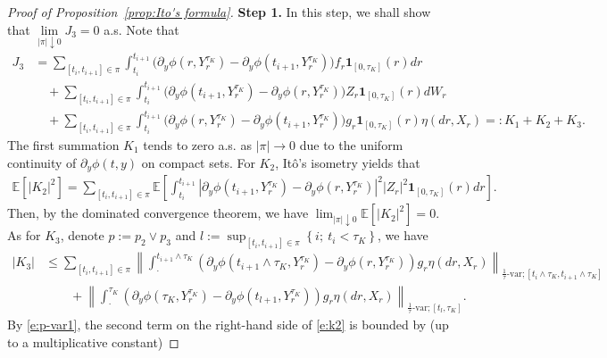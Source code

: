 \documentclass[11pt,reqno]{amsart}
\def\E{\mathbb E}
\numberwithin{equation}{section}
\begin{document}
\begin{proof}[Proof of Proposition~\ref{prop:Ito's formula}]
\textbf{Step 1.}
In this step, we shall show that $\lim\limits_{|\pi|\downarrow 0}J_{3} = 0$ a.s.  Note that
\begin{equation*}	\begin{aligned}
J_{3} &= \sum_{[t_{i},t_{i+1}]\in \pi} \int_{t_{i}}^{t_{i+1}}\big(\partial_{y}\phi(r,Y^{\tau_{K}}_{r}) - \partial_{y}\phi(t_{i+1},Y^{\tau_{K}}_{r})\big) f_r \mathbf{1}_{[0,\tau_{K}]}(r)dr\\
&\quad + \sum_{[t_{i},t_{i+1}]\in \pi} \int_{t_{i}}^{t_{i+1}}\big(\partial_{y}\phi(t_{i+1},Y^{\tau_{K}}_{r}) - \partial_{y}\phi(r,Y^{\tau_{K}}_{r})\big) Z_r \mathbf{1}_{[0,\tau_{K}]}(r)dW_{r}\\
&\quad +\sum_{[t_{i},t_{i+1}]\in \pi}
\int_{t_{i}}^{t_{i+1}}\big(\partial_{y}\phi(r,Y^{\tau_{K}}_{r}) - \partial_{y}\phi(t_{i+1},Y^{\tau_{K}}_{r})\big) g_r \mathbf{1}_{[0,\tau_{K}]}(r) \eta(dr,X_{r}) =: K_1 + K_2 +K_3.
\end{aligned}
\end{equation*}
The first summation $K_1$ tends to zero a.s. as $|\pi|\to 0$ due to the uniform continuity of $\partial_y \phi(t, y)$ on compact sets. For $K_{2}$, It\^o's isometry yields that
\begin{equation*}		\begin{aligned}	\mathbb{E}\left[|K_{2}|^{2}\right] = \sum_{[t_{i},t_{i+1}]\in\pi} \E\left[\int_{t_{i}}^{t_{i+1}} |\partial_{y}\phi(t_{i+1},Y^{\tau_{K}}_{r})-\partial_{y}\phi(r,Y^{\tau_{K}}_{r})|^{2}|Z_{r}|^{2}\mathbf{1}_{[0,\tau_{K}]}(r) dr\right].
\end{aligned}
\end{equation*}
Then, by the dominated convergence theorem, we have
$\lim_{|\pi|\downarrow 0}\mathbb{E}\left[|K_{2}|^{2}\right] = 0.$			
As for $K_{3}$, denote $p := p_{2}\vee p_{3}$ and  $l := \sup_{[t_{i},t_{i+1}]\in \pi}\left\{i;\ t_{i} < \tau_{K}\right\}$, we have
\begin{align}\label{e:k2}\nonumber
|K_{3}|
&\le \sum_{[t_{i},t_{i+1}]\in \pi} \left\|\int_{\cdot}^{t_{i+1}\land \tau_{K}}(\partial_{y}\phi(t_{i+1}\land \tau_{K},Y^{\tau_{K}}_{r}) - \partial_{y}\phi(r,Y^{\tau_{K}}_{r}))g_{r}\eta(dr,X_{r})\right\|_{\frac{1}{\tau}\text{-var};[t_{i}\land \tau_{K},t_{i+1}\land \tau_{K}]}\\  
&\qquad + \left\|\int_{\cdot}^{\tau_{K}}(\partial_{y}\phi( \tau_{K},Y^{\tau_{K}}_{r}) - \partial_{y}\phi(t_{l+1},Y^{\tau_{K}}_{r}))g_{r}\eta(dr,X_{r})\right\|_{\frac{1}{\tau}\text{-var};[t_{l},\tau_{K}]}.
\end{align}
By \eqref{e:p-var1}, the second term on the right-hand side of \eqref{e:k2} is bounded by  (up to a multiplicative constant)

\end{proof}
\end{document}
